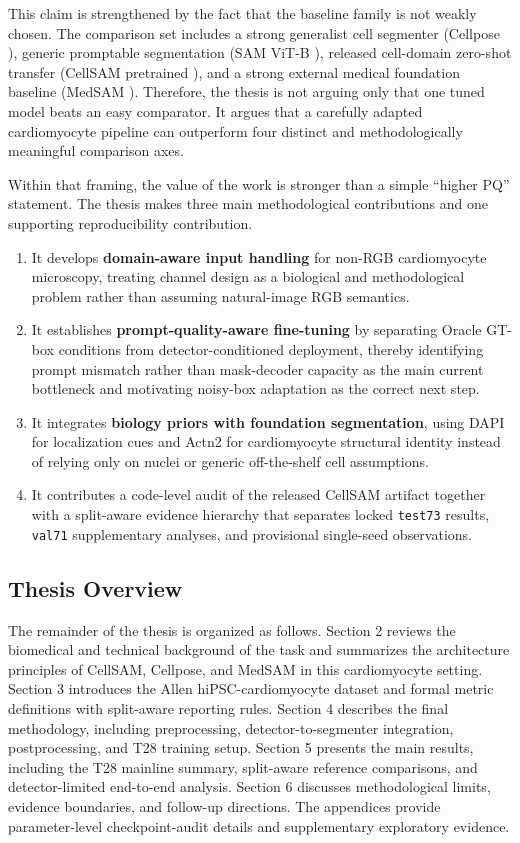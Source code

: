 This claim is strengthened by the fact that the baseline family is not weakly chosen. The comparison set includes a strong generalist cell segmenter (Cellpose \cite{stringer2021cellpose}), generic promptable segmentation (SAM ViT-B \cite{kirillov2023sam}), released cell-domain zero-shot transfer (CellSAM pretrained \cite{israel2024cellsam}), and a strong external medical foundation baseline (MedSAM \cite{ma2024medsam}). Therefore, the thesis is not arguing only that one tuned model beats an easy comparator. It argues that a carefully adapted cardiomyocyte pipeline can outperform four distinct and methodologically meaningful comparison axes.

Within that framing, the value of the work is stronger than a simple ``higher PQ'' statement. The thesis makes three main methodological contributions and one supporting reproducibility contribution.

\begin{enumerate}
\def\labelenumi{\arabic{enumi}.}
\tightlist
\item
  It develops \textbf{domain-aware input handling} for non-RGB cardiomyocyte microscopy, treating channel design as a biological and methodological problem rather than assuming natural-image RGB semantics.
\item
  It establishes \textbf{prompt-quality-aware fine-tuning} by separating Oracle GT-box conditions from detector-conditioned deployment, thereby identifying prompt mismatch rather than mask-decoder capacity as the main current bottleneck and motivating noisy-box adaptation as the correct next step.
\item
  It integrates \textbf{biology priors with foundation segmentation}, using DAPI for localization cues and Actn2 for cardiomyocyte structural identity instead of relying only on nuclei or generic off-the-shelf cell assumptions.
\item
  It contributes a code-level audit of the released CellSAM artifact together with a split-aware evidence hierarchy that separates locked \texttt{test73} results, \texttt{val71} supplementary analyses, and provisional single-seed observations.
\end{enumerate}

\subsection{Thesis Overview}\label{thesis-overview}

The remainder of the thesis is organized as follows. Section 2 reviews the biomedical and technical background of the task and summarizes the architecture principles of CellSAM, Cellpose, and MedSAM in this cardiomyocyte setting. Section 3 introduces the Allen hiPSC-cardiomyocyte dataset and formal metric definitions with split-aware reporting rules. Section 4 describes the final methodology, including preprocessing, detector-to-segmenter integration, postprocessing, and T28 training setup. Section 5 presents the main results, including the T28 mainline summary, split-aware reference comparisons, and detector-limited end-to-end analysis. Section 6 discusses methodological limits, evidence boundaries, and follow-up directions. The appendices provide parameter-level checkpoint-audit details and supplementary exploratory evidence.
